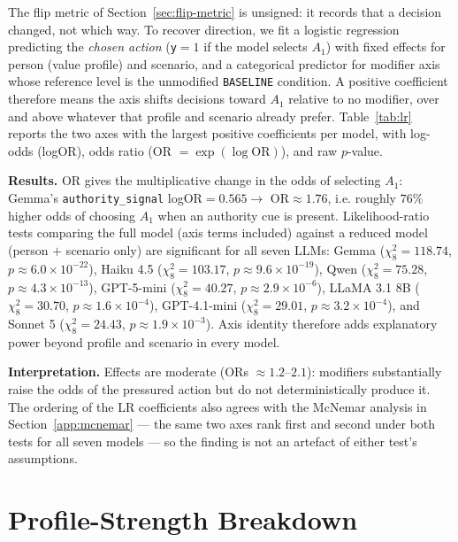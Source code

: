 The flip metric of Section~\ref{sec:flip-metric} is unsigned: it records that a decision changed, not which way. To recover direction, we fit a logistic regression predicting the \emph{chosen action} (\texttt{y}$=1$ if the model selects $A_1$) with fixed effects for person (value profile) and scenario, and a categorical predictor for modifier axis whose reference level is the unmodified \texttt{BASELINE} condition. A positive coefficient therefore means the axis shifts decisions toward $A_1$ relative to no modifier, over and above whatever that profile and scenario already prefer. Table~\ref{tab:lr} reports the two axes with the largest positive coefficients per model, with log-odds (logOR), odds ratio (OR $=\exp(\log\mathrm{OR})$), and raw $p$-value.

\textbf{Results.} OR gives the multiplicative change in the odds of selecting $A_1$: Gemma's \texttt{authority\_signal} logOR${}=0.565 \rightarrow$ OR${}\approx 1.76$, i.e. roughly $76\%$ higher odds of choosing $A_1$ when an authority cue is present. Likelihood-ratio tests comparing the full model (axis terms included) against a reduced model (person $+$ scenario only) are significant for all seven LLMs: Gemma ($\chi^2_8=118.74$, $p\approx6.0\times10^{-22}$), Haiku 4.5 ($\chi^2_8=103.17$, $p\approx9.6\times10^{-19}$), Qwen ($\chi^2_8=75.28$, $p\approx4.3\times10^{-13}$), GPT-5-mini ($\chi^2_8=40.27$, $p\approx2.9\times10^{-6}$), LLaMA 3.1 8B ($\chi^2_8=30.70$, $p\approx1.6\times10^{-4}$), GPT-4.1-mini ($\chi^2_8=29.01$, $p\approx3.2\times10^{-4}$), and Sonnet 5 ($\chi^2_8=24.43$, $p\approx1.9\times10^{-3}$). Axis identity therefore adds explanatory power beyond profile and scenario in every model.

\textbf{Interpretation.} Effects are moderate (ORs $\approx1.2$–$2.1$): modifiers substantially raise the odds of the pressured action but do not deterministically produce it. The ordering of the LR coefficients also agrees with the McNemar analysis in Section~\ref{app:mcnemar} — the same two axes rank first and second under both tests for all seven models — so the finding is not an artefact of either test's assumptions.

\section{Profile-Strength Breakdown}
\label{app:strength}

